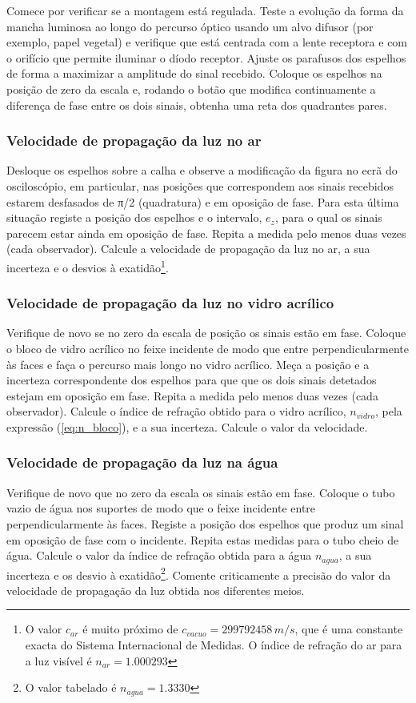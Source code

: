 \documentclass[a4paper,12pt]{article}      %
\begin{document}
Comece por verificar se a montagem está regulada. Teste a evolução da forma da mancha 
luminosa ao longo do percurso óptico usando um alvo difusor (por exemplo, papel vegetal) e 
verifique que está centrada com a lente receptora e com o orifício que permite iluminar o 
díodo receptor. Ajuste os parafusos dos espelhos de forma a maximizar a amplitude do sinal 
recebido.
Coloque os espelhos na posição de zero da escala e, rodando o botão que modifica 
continuamente a diferença de fase entre os dois sinais, obtenha uma reta dos quadrantes pares. 

\subsubsection{\sf Velocidade de propagação da luz no ar}
Desloque os espelhos sobre a calha e observe a modificação da figura no ecrã do 
osciloscópio, em particular, nas posições que correspondem aos sinais recebidos estarem 
desfasados de π/2 (quadratura) e em oposição de fase. Para esta última situação registe a 
posição dos espelhos e o intervalo, $e_z$,  para o qual os sinais parecem estar ainda em 
oposição de fase. Repita a medida pelo menos duas vezes (cada observador). 
Calcule a velocidade de propagação da luz no ar, a sua incerteza e o desvios à exatidão\footnote{O valor $c_{ar}$ é muito próximo de $c_{vacuo} = 299 792 458\,m/s$, que é uma constante exacta do Sistema Internacional de Medidas. O índice de refração do ar para a luz visível é $n_{ar}=1.000293$}. 

\subsubsection{\sf Velocidade de propagação da luz no vidro acrílico}
Verifique de novo se no zero da escala de posição os sinais estão em fase. Coloque o bloco de vidro 
acrílico no feixe incidente de modo que entre perpendicularmente às faces e faça o percurso 
mais longo no vidro acrílico. Meça a posição e a incerteza correspondente dos espelhos para que 
que os dois sinais detetados estejam em oposição em fase. Repita a medida pelo menos 
duas vezes (cada observador).
Calcule o índice de refração obtido para o vidro acrílico, $n_{vidro}$, pela expressão (\ref{eq:n_bloco}),  e a sua incerteza. Calcule o valor da velocidade.

\subsubsection{\sf Velocidade de propagação da luz na água}
Verifique de novo que no zero da escala os sinais estão em fase. Coloque o tubo vazio de 
água nos suportes de modo que o feixe incidente entre perpendicularmente às faces.
Registe a posição dos espelhos que produz um sinal em oposição de fase com o incidente. 
Repita estas medidas para o tubo cheio de água. 
Calcule o valor da índice de refração obtida para a água $n_{agua}$, a sua incerteza e os desvio à exatidão\footnote{O valor tabelado é $n_{agua}=1.3330$}. 
Comente criticamente a precisão do valor da velocidade de propagação da luz obtida nos 
diferentes meios.
\end{document}
